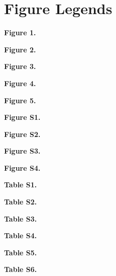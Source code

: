 \documentclass[letterpaper]{article}
\newcommand*{\commonDir}{./common/}    %
\begin{document}
\section{Figure Legends}


\noindent\textbf{Figure 1.} 
\eeFBAfigOneCap

\hspace{1ex}

\noindent\textbf{Figure 2.} 
\eeFBAfigTwoCap

\hspace{1ex}

\noindent\textbf{Figure 3.} 
\eeFBAfigThreeCap

\hspace{1ex}

\noindent\textbf{Figure 4.}
\eeFBAfigFourCap

\hspace{1ex}

\noindent\textbf{Figure 5.}
\eeFBAfigFiveCap

\hspace{1ex}

\noindent\textbf{Figure S1.} 
\eeFBAfigSOneCap

\hspace{1ex}

\noindent\textbf{Figure S2.} 
\eeFBAfigSTwoCap

\hspace{1ex}

\noindent\textbf{Figure S3.} 
\eeFBAfigSThreeCap

\hspace{1ex}

\noindent\textbf{Figure S4.}
\eeFBAfigSFourCap

\hspace{1ex}

\noindent\textbf{Table S1.} 
\eeFBATabSOneCap

\hspace{1ex}

\noindent\textbf{Table S2.} 
\eeFBATabSTwoCap

\hspace{1ex}

\noindent\textbf{Table S3.} 
\eeFBATabSThreeCap

\hspace{1ex}

\noindent\textbf{Table S4.}
\eeFBATabSFourCap

\hspace{1ex}

\noindent\textbf{Table S5.}
\eeFBATabSFiveCap

\hspace{1ex}

\noindent\textbf{Table S6.}
\eeFBATabSSixCap

\hspace{1ex}






\end{document}
